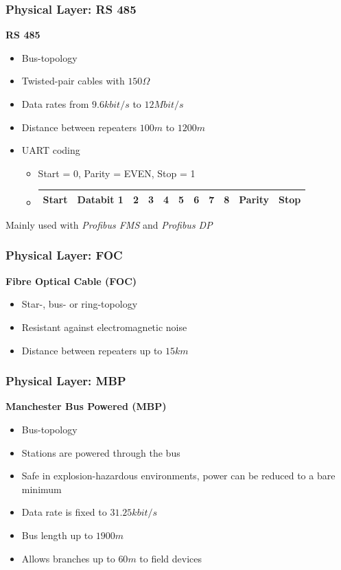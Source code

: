 \documentclass{beamer}
\begin{document}
\begin{frame}
  \frametitle{Physical Layer: RS 485}
  \textbf{RS 485}
  \begin{itemize}
    \item Bus-topology
    \item Twisted-pair cables with $150\Omega$
    \item Data rates from $9.6kbit/s$ to $12Mbit/s$
    \item Distance between repeaters $100m$ to $1200m$
    \item UART coding \\
      \footnotesize
      \begin{itemize}
        \item Start = 0, Parity = EVEN, Stop = 1 \\
        \item
          \begin{tabular}[h]{|c|c|c|c|c|c|c|c|c|c|c|}
            \hline
            Start & Databit 1 & 2 & 3 & 4 & 5 & 6 & 7 & 8 & Parity & Stop \\
            \hline
          \end{tabular}
      \end{itemize}
  \end{itemize}
  Mainly used with \textit{Profibus FMS} and \textit{Profibus DP}
\end{frame}

\begin{frame}
  \frametitle{Physical Layer: FOC}
  \textbf{Fibre Optical Cable (FOC)}
  \begin{itemize}
    \item Star-, bus- or ring-topology
    \item Resistant against electromagnetic noise
    \item Distance between repeaters up to $15km$
  \end{itemize}
\end{frame}

\begin{frame}
  \frametitle{Physical Layer: MBP}
  \textbf{Manchester Bus Powered (MBP)}
  \begin{itemize}
    \item Bus-topology
    \item Stations are powered through the bus
    \item Safe in explosion-hazardous environments, power can be reduced to a bare minimum
    \item Data rate is fixed to $31.25kbit/s$
    \item Bus length up to $1900m$
    \item Allows branches up to $60m$ to field devices
  \end{itemize}
\end{frame}
\end{document}
